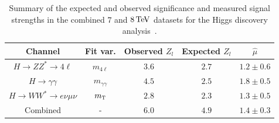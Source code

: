 \begin{table}[h!]
\centering
\captionsetup{justification=centering}

\hspace{-10pt}
\begin{tabular}{|c|c|c|c|c|}
\hline
Channel & Fit var. & Observed $Z_l$ & Expected $Z_l$ & $\hat{\mu}$ \\ \hline
$H\to ZZ^* \to 4\ell$ & $m_{4\ell}$ & $3.6$ & $2.7$ & $1.2 \pm 0.6$ \\ \hline
$H\to\gamma\gamma$ & $m_{\gamma\gamma}$ & $4.5$ & $2.5$ & $1.8 \pm 0.5$ \\ \hline
$H\to WW^* \to e\nu\mu\nu$ & $m_{\textrm{\footnotesize\sc t}}$ & $2.8$ & $2.3$ & $1.3 \pm 0.5$ \\ \hline
Combined & - & $6.0$ & $4.9$ & $1.4 \pm 0.3$ \\ \hline
\end{tabular}

\caption{
Summary of the expected and observed significance and measured signal strengths in the combined $7$ and $8 \TeV$ datasets for the Higgs discovery analysis~\cite{Discovery}. 
}
\label{tab:discovery_summary}
\end{table}

